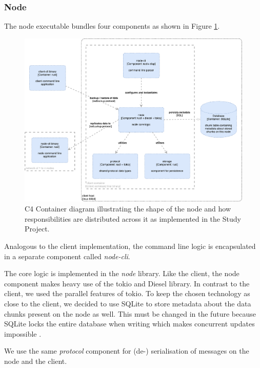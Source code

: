 \subsubsection{Node}

The node executable bundles four components as shown in Figure \ref{fig:c4-node-container}.  

\begin{figure}[h]
	\centering
	\includegraphics[width=1\linewidth]{resources/c4-node-container}
	\caption[Node specific C4 Container diagram]{C4 Container diagram illustrating the shape of the node and how responsibilities are distributed across it as implemented in the Study Project.}
	\label{fig:c4-node-container}
\end{figure}

Analogous to the client implementation, the command line logic is encapsulated in a separate component called \emph{node-cli}.

The core logic is implemented in the \emph{node} library. Like the client, the node component makes heavy use of the tokio and Diesel library. In contrast to the client, we used the parallel features of tokio. To keep the chosen technology as close to the client, we decided to use SQLite to store metadata about the data \glspl{chunk} present on the node as well. This must be changed in the future because SQLite locks the entire database when writing which makes concurrent updates impossible \cite{sqlite-locking}.

We use the same \emph{protocol} component for (de-) serialisation of messages on the node and the client.

